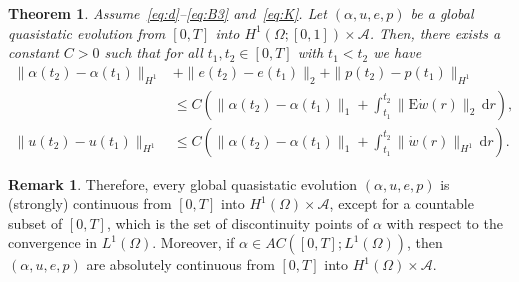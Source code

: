 \documentclass[reqno]{amsart}
\newtheorem{theorem}[corollary]{Theorem}
\theoremstyle{definition}
\newtheorem{remark}[corollary]{Remark}
\numberwithin{equation}{section}
\def\de {\mathrm{d}}
\def\EE {\mathrm{E}}
\begin{document}
\begin{theorem}\label{thm:cont_time}
Assume~\eqref{eq:d}--\eqref{eq:B3} and~\eqref{eq:K}. Let $(\alpha,u,e,p)$ be a global quasistatic evolution from $[0,T]$ into $H^1(\Omega;[0,1])\times \mathcal A$. Then, there exists a constant $C>0$ such that for all $t_1,t_2\in[0,T]$ with $t_1<t_2$ we have
\begin{align}
\|\alpha(t_2)-\alpha(t_1)\|_{H^1}&+\|e(t_2)-e(t_1)\|_2+\|p(t_2)-p(t_1)\|_{H^1}\nonumber\\
&\le C\left(\|\alpha(t_2)-\alpha(t_1)\|_1+\int_{t_1}^{t_2}\|\EE \dot w(r)\|_2\,\de r\right),\label{eq:cont1}\\
\|u(t_2)-u(t_1)\|_{H^1}&\le C\left(\|\alpha(t_2)-\alpha(t_1)\|_1+\int_{t_1}^{t_2}\|\dot w(r)\|_{H^1}\,\de r\right).\label{eq:cont2}
\end{align}
\end{theorem}

\begin{remark}
Therefore, every global quasistatic evolution $(\alpha,u,e,p)$ is (strongly) continuous from $[0,T]$ into $H^1(\Omega)\times\mathcal A$, except for a countable subset of $[0,T]$, which is the set of discontinuity points of $\alpha$ with respect to the convergence in $L^1(\Omega)$. Moreover, if $\alpha\in AC([0,T];L^1(\Omega))$, then $(\alpha,u,e,p)$ are absolutely continuous from $[0,T]$ into $H^1(\Omega)\times \mathcal A$.
\end{remark}
\end{document}
